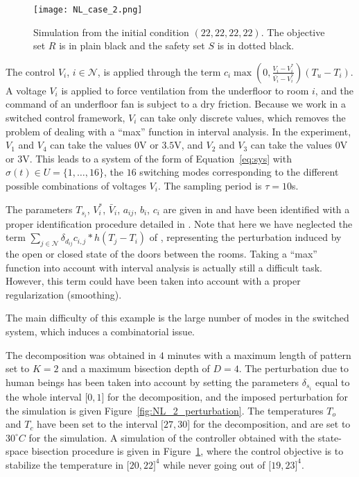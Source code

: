 \begin{figure}[t]
  \centering
  \texttt{[image: NL\_case\_2.png]}
  \caption{Simulation from the initial condition $(22,22,22,22)$. The
    objective set $R$ is in plain black and the safety set $S$ is in
    dotted black.}
  \label{fig:NL_2}
\end{figure}

The control $V_i$, $i \in \mathcal{N}$, is applied through the term
$c_i \max(0,\frac{V_i - V_i^\text{*}}{\bar{ V_i} -
  V_i^{\text{*}}})(T_u - T_i)$.  A voltage $V_i$ is applied to force
ventilation from the underfloor to room $i$, and the command of an
underfloor fan is subject to a dry friction.  Because we work in a
switched control framework, $V_i$ can take only discrete values, which
removes the problem of dealing with a ``max'' function in interval
analysis. In the experiment, $V_1$ and $V_4$ can take the values $0$V
or $3.5$V, and $V_2$ and $V_3$ can take the values $0$V or $3$V. This
leads to a system of the form of Equation~\eqref{eq:sys} with
$\sigma(t) \in U =\{ 1, \dots, 16 \}$, the $16$ switching modes
corresponding to the different possible combinations of voltages
$V_i$.  The sampling period is $\tau = 10$s.

The parameters $T_{s_i}$, $V_i^\text{*}$, $\bar V_i$, $a_{ij}$, $b_i$,
$c_i$ are given in \cite{meyer:tel-01232640} and have been identified
with a proper identification procedure detailed in
\cite{meyer2014ecc}.  Note that here we have neglected the term
$\sum_{j \in \mathcal{N}} \delta_{d_{ij}}c_{i,j} \ast h(T_j - T_i)$ of
\cite{meyer:tel-01232640}, representing the perturbation induced by
the open or closed state of the doors between the rooms. Taking a
``max'' function into account with interval analysis is actually still
a difficult task. However, this term could have been taken into
account with a proper regularization (smoothing).

The main difficulty of this example is the large number of modes in
the switched system, which induces a combinatorial issue.

The decomposition was obtained in $4$ minutes with a maximum length of
pattern set to $K = 2$ and a maximum bisection depth of $D = 4$.  The
perturbation due to human beings has been taken into account by
setting the parameters $\delta_{s_i}$ equal to the whole interval
$\lbrack 0,1 \rbrack$ for the decomposition, and the imposed
perturbation for the simulation is given
Figure~\ref{fig:NL_2_perturbation}.  The temperatures $T_o$ and $T_c$
have been set to the interval $\lbrack27,30\rbrack$ for the
decomposition, and are set to $30^\circ C$ for the simulation.  A
simulation of the controller obtained with the state-space bisection
procedure is given in Figure~\ref{fig:NL_2}, where the control
objective is to stabilize the temperature in $\lbrack 20 , 22 \rbrack
^4$ while never going out of $\lbrack 19 , 23 \rbrack ^4$.

